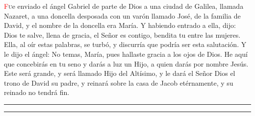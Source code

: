 \documentclass[10pt,twoside]{book}
\begin{document}
\begin{paracol}{2}
\begin{rightcolumn}
            \lettrine[lines=2]{\textcolor{red}{F}}ue enviado el ángel Gabriel de parte de Dios a una ciudad de Galilea, llamada Nazaret, 
            a una doncella desposada con un varón llamado José, de la familia de David, y el nombre de la doncella era María. 
            Y habiendo entrado a ella, dijo: Dios te salve, llena de gracia, el Señor es contigo, bendita tu entre las mujeres.
            Ella, al oír estas palabras, se turbó, y discurría que podría ser esta salutación. Y le dijo el ángel: No temas, María, 
            pues hallaste gracia a los ojos de Dios. He aquí que concebirás en tu seno y darás a luz un Hijo, a quien darás por nombre Jesús. 
            Este será grande, y será llamado Hijo del Altísimo, y le dará el Señor Dios el trono de David su padre, y reinará sobre la 
            casa de Jacob etérnamente, y su reinado no tendrá fin.
      \end{rightcolumn}
\end{paracol}

\begin{center}
      \rule{25em}{0.4pt}
\end{center}



\begin{center}
      \rule{25em}{0.4pt}
\end{center}
\end{document}
